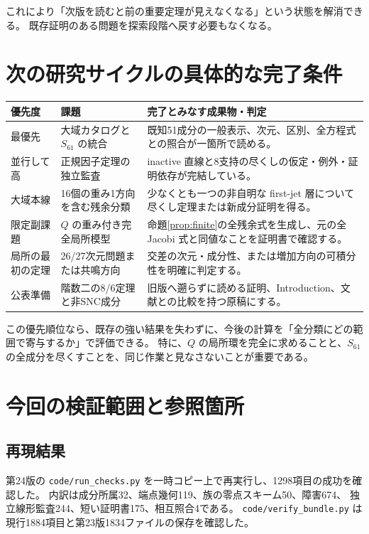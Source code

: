 \documentclass[11pt,a4paper]{ltjsarticle}
\theoremstyle{remark}\newtheorem{remark}[proposition]{注意}
\begin{document}
これにより「次版を読むと前の重要定理が見えなくなる」という状態を解消できる。
既存証明のある問題を探索段階へ戻す必要もなくなる。

\section{次の研究サイクルの具体的な完了条件}

\begin{center}\small
\begin{tabular}{@{}p{20mm}p{62mm}p{72mm}@{}}\toprule
優先度 & 課題 & 完了とみなす成果物・判定\\\midrule
最優先 & 大域カタログと $S_{61}$ の統合 & 既知51成分の一般表示、次元、区別、全方程式との照合が一箇所で読める。\\
並行して高 & 正規因子定理の独立監査 & inactive 直線と8支持の尽くしの仮定・例外・証明依存が完結している。\\
大域本線 & 16個の重み1方向を含む残余分類 & 少なくとも一つの非自明な first-jet 層について尽くし定理または新成分証明を得る。\\
限定副課題 & $Q$ の重み付き完全局所模型 & 命題\ref{prop:finite}の全残余式を生成し、元の全 Jacobi 式と同値なことを証明書で確認する。\\
局所の最初の定理 & 26/27次元問題または共鳴方向 & 交差の次元・成分性、または増加方向の可積分性を明確に判定する。\\
公表準備 & 階数二の8/6定理と非SNC成分 & 旧版へ遡らずに読める証明、Introduction、文献との比較を持つ原稿にする。\\\bottomrule
\end{tabular}
\end{center}

この優先順位なら、既存の強い結果を失わずに、今後の計算を「全分類にどの範囲で寄与するか」で評価できる。
特に、$Q$ の局所環を完全に求めることと、$S_{61}$ の全成分を尽くすことを、同じ作業と見なさないことが重要である。

\appendix
\section{今回の検証範囲と参照箇所}

\subsection{再現結果}

第24版の \texttt{code/run\_checks.py} を一時コピー上で再実行し、1298項目の成功を確認した。
内訳は成分所属32、端点幾何119、族の零点スキーム50、障害674、
独立線形監査244、短い証明書175、相互照合4である。
\texttt{code/verify\_bundle.py} は現行1884項目と第23版1834ファイルの保存を確認した。
\end{document}
